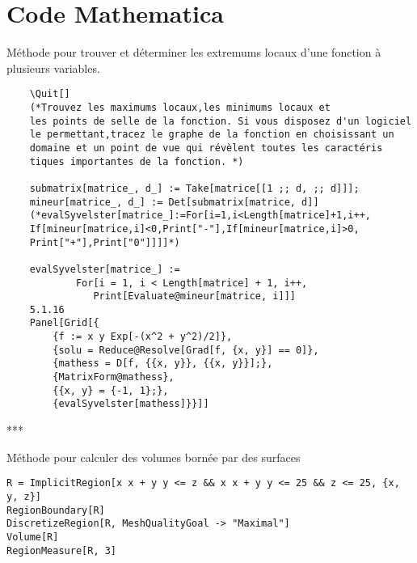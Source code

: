 \section{Code Mathematica}
	\begin{center}Méthode pour trouver et déterminer les extremums locaux d'une fonction à plusieurs variables.\end{center}
	
	\begin{verbatim}
	\Quit[]
	(*Trouvez les maximums locaux,les minimums locaux et
	les points de selle de la fonction. Si vous disposez d'un logiciel
	le permettant,tracez le graphe de la fonction en choisissant un 
	domaine et un point de vue qui révèlent toutes les caractéris­
	tiques importantes de la fonction. *)
	
	submatrix[matrice_, d_] := Take[matrice[[1 ;; d, ;; d]]];
	mineur[matrice_, d_] := Det[submatrix[matrice, d]]
	(*evalSyvelster[matrice_]:=For[i=1,i<Length[matrice]+1,i++,
	If[mineur[matrice,i]<0,Print["-"],If[mineur[matrice,i]>0,
	Print["+"],Print["0"]]]]*)
	
	evalSyvelster[matrice_] := 
	        For[i = 1, i < Length[matrice] + 1, i++, 
	           Print[Evaluate@mineur[matrice, i]]]
	5.1.16
	Panel[Grid[{
	    {f := x y Exp[-(x^2 + y^2)/2]},
	    {solu = Reduce@Resolve[Grad[f, {x, y}] == 0]},
	    {mathess = D[f, {{x, y}}, {{x, y}}];},
	    {MatrixForm@mathess},
	    {{x, y} = {-1, 1};},
	    {evalSyvelster[mathess]}}]]
	\end{verbatim}
	\begin{center}***\end{center}
\begin{center}Méthode pour calculer des volumes bornée par des surfaces \end{center}
		\begin{flushleft}
			\verb|R = ImplicitRegion[x x + y y <= z && x x + y y <= 25 && z <= 25, {x, y, z}]|\\
			\verb|RegionBoundary[R]|\\
			\verb|DiscretizeRegion[R, MeshQualityGoal -> "Maximal"]|\\
			\verb|Volume[R]|\\
			\verb|RegionMeasure[R, 3]|
		\end{flushleft}	